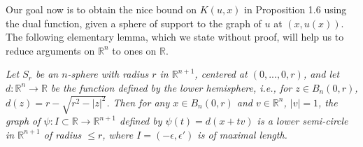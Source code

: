 \documentclass[10pt]{article}
\newenvironment{lemma}[2][Lemma]{\begin{trivlist}
\item[\hskip \labelsep {\bfseries #1}\hskip \labelsep {\bfseries #2.}]}{\end{trivlist}}
\begin{document}
Our goal now is to obtain the nice bound on $K(u,x)$ in Proposition 1.6 using the dual function, given a sphere of support to the graph of $u$ at $(x,u(x))$. The following elementary lemma, which we state without proof, will help us to reduce arguments on $\mathbb{R}^n$ to ones on $\mathbb{R}$.
\begin{lemma}{3.7}
\textit{Let $S_{r}$ be an $n$-sphere with radius $r$ in $\mathbb{R}^{n+1}$, centered at $(0,...,0,r)$, and let $d:\mathbb{R}^{n}\rightarrow \mathbb{R}$ be the function defined by the lower hemisphere, i.e., for $z\in B_n (0,r)$, $d(z)= r- \sqrt{r^{2}-|z|^{2}}$. Then for any $x\in B_n(0,r)$ and $v \in \mathbb{R}^n$, $|v|=1$, the graph of $\psi:I \subset \mathbb{R}\rightarrow \mathbb{R}^{n+1}$ defined by $\psi(t)=d(x+tv)$ is a lower semi-circle in $\mathbb{R}^{n+1}$ of radius $\leq r$, where $I=(-\epsilon, \epsilon')$ is of maximal length.}
\end{lemma}
\end{document}
